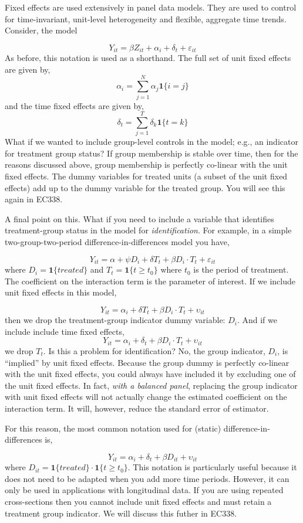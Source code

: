 \documentclass[
  letterpaper,
  DIV=11,
  numbers=noendperiod]{scrreprt}
\begin{document}
Fixed effects are used extensively in panel data models. They are used
to control for time-invariant, unit-level heterogeneity and flexible,
aggregate time trends. Consider, the model

\[
  Y_{it} = \beta Z_{it} + \alpha_i + \delta_t + \varepsilon_{it}
\] As before, this notation is used as a shorthand. The full set of unit
fixed effects are given by, \[
\alpha_i=\sum_{j=1}^N\alpha_j\mathbf{1}\{i=j\}
\] and the time fixed effects are given by, \[
\delta_t=\sum_{j=1}^T\delta_k\mathbf{1}\{t=k\}
\] What if we wanted to include group-level controls in the model; e.g.,
an indicator for treatment group status? If group membership is stable
over time, then for the reasons discussed above, group membership is
perfectly co-linear with the unit fixed effects. The dummy variables for
treated units (a subset of the unit fixed effects) add up to the dummy
variable for the treated group. You will see this again in EC338.

A final point on this. What if you need to include a variable that
identifies treatment-group status in the model for
\emph{identification}. For example, in a simple two-group-two-period
difference-in-differences model you have,

\[
  Y_{it} = \alpha + \psi D_i + \delta T_t + \beta D_i\cdot T_t + \varepsilon_{it}
\] where \(D_i = \mathbf{1}\{treated\}\) and
\(T_t = \mathbf{1}\{t\geq t_0\}\) where \(t_0\) is the period of
treatment. The coefficient on the interaction term is the parameter of
interest. If we include unit fixed effects in this model,

\[
  Y_{it} = \alpha_i + \delta T_t + \beta D_i\cdot T_t + \upsilon_{it}
\] then we drop the treatment-group indicator dummy variable: \(D_i\).
And if we include include time fixed effects, \[
  Y_{it} = \alpha_i + \delta_t + \beta D_i\cdot T_t + \upsilon_{it}
\] we drop \(T_t\). Is this a problem for identification? No, the group
indicator, \(D_i\), is ``implied'' by unit fixed effects. Because the
group dummy is perfectly co-linear with the unit fixed effects, you
could always have included it by excluding one of the unit fixed
effects. In fact, \emph{with a balanced panel}, replacing the group
indicator with unit fixed effects will not actually change the estimated
coefficient on the interaction term. It will, however, reduce the
standard error of estimator.

For this reason, the most common notation used for (static)
difference-in-differences is,

\[
  Y_{it} = \alpha_i + \delta_t + \beta D_{it} + \upsilon_{it}
\] where \(D_{it} = \mathbf{1}\{treated\}\cdot\mathbf{1}\{t\geq t_0\}\).
This notation is particularly useful because it does not need to be
adapted when you add more time periods. However, it can only be used in
applications with longitudinal data. If you are using repeated
cross-sections then you cannot include unit fixed effects and must
retain a treatment group indicator. We will discuss this futher in
EC338.
\end{document}
